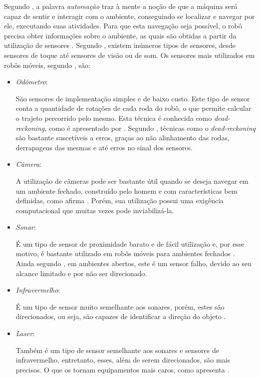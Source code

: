 Segundo \cite{roboticaIndustrial}, a palavra \textit{automação} traz à mente a noção de que a máquina será capaz de sentir e interagir com o ambiente, conseguindo se localizar e navegar por ele, executando suas atividades. Para que esta navegação seja possível, o robô precisa obter informações sobre o ambiente, as quais são obtidas a partir da utilização de sensores \cite{simpleMobile}. Segundo \cite{agenteExploratorioKalman}, existem inúmeros tipos de sensores, desde sensores de toque até sensores de visão ou de som. Os sensores mais utilizados em robôs móveis, segundo \cite{agenteExploratorioKalman}, são:
\begin{itemize}
	\item \textit{Odômetro}:

		São sensores de implementação simples e de baixo custo. Este tipo de sensor conta a quantidade de rotações de cada roda do robô, o que permite calcular o trajeto percorrido pelo mesmo. Esta técnica é conhecida como \textit{dead-reckoning}, como é apresentado por \cite{integrationVisionSLAMnonlinear}. Segundo \cite{agenteExploratorioKalman}, técnicas como o \textit{dead-reckoning} são bastante suscetíveis a erros, graças ao não alinhamento das rodas, derrapagens das mesmas e até erros no sinal dos sensores.

	\item \textit{Câmera}:

		A utilização de câmeras pode ser bastante útil quando se deseja navegar em um ambiente fechado, construído pelo homem e com características bem definidas, como afirma \cite{agenteExploratorioKalman}. Porém, sua utilização possui uma exigência computacional \cite{localizacaoEMapeamentoPaulo} que muitas vezes pode inviabilizá-la.

	\item \textit{Sonar}:

		É um tipo de sensor de proximidade barato e de fácil utilização e, por esse motivo, é bastante utilizado em robôs móveis para ambientes fechados \cite{agenteExploratorioKalman}. Ainda segundo \cite{agenteExploratorioKalman}, em ambientes abertos, este é um sensor falho, devido ao seu alcance limitado e por não ser direcionado.

	\item \textit{Infravermelho}:

		É um tipo de sensor muito semelhante aos sonares, porém, estes são direcionados, ou seja, são capazes de identificar a direção do objeto \cite{theCleaningProject}.

	\item \textit{Laser}:

		Também é um tipo de sensor semelhante aos sonares e sensores de infravermelho, entretanto, esses, além de serem direcionados, são mais precisos. O que os tornam equipamentos mais caros, como apresenta \cite{agenteExploratorioKalman}.

\end{itemize}

